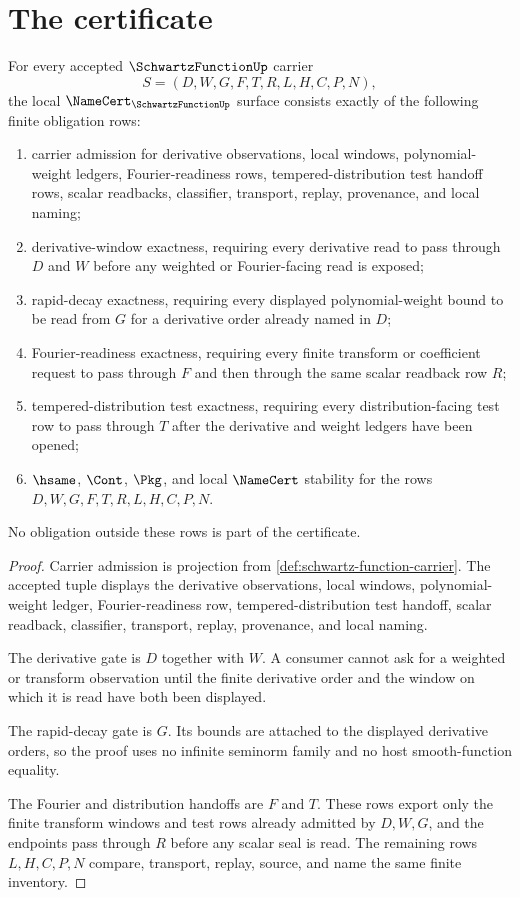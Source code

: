 \section{The certificate}
\label{sec:schwartz-function-certificate}

\begin{theorem}
\label{thm:schwartz-function-namecert-obligations}
For every accepted $\SchwartzFunctionUp$ carrier
$$
S=(D,W,G,F,T,R,L,H,C,P,N),
$$
the local $\NameCert_{\SchwartzFunctionUp}$ surface consists exactly of the following finite obligation rows:
\begin{enumerate}
\item carrier admission for derivative observations, local windows, polynomial-weight ledgers, Fourier-readiness rows, tempered-distribution test handoff rows, scalar readbacks, classifier, transport, replay, provenance, and local naming;
\item derivative-window exactness, requiring every derivative read to pass through $D$ and $W$ before any weighted or Fourier-facing read is exposed;
\item rapid-decay exactness, requiring every displayed polynomial-weight bound to be read from $G$ for a derivative order already named in $D$;
\item Fourier-readiness exactness, requiring every finite transform or coefficient request to pass through $F$ and then through the same scalar readback row $R$;
\item tempered-distribution test exactness, requiring every distribution-facing test row to pass through $T$ after the derivative and weight ledgers have been opened;
\item $\hsame$, $\Cont$, $\Pkg$, and local $\NameCert$ stability for the rows $D,W,G,F,T,R,L,H,C,P,N$.
\end{enumerate}
No obligation outside these rows is part of the certificate.
\end{theorem}
\begin{proof}
Carrier admission is projection from \autoref{def:schwartz-function-carrier}. The accepted tuple displays the derivative observations, local windows, polynomial-weight ledger, Fourier-readiness row, tempered-distribution test handoff, scalar readback, classifier, transport, replay, provenance, and local naming.

The derivative gate is $D$ together with $W$. A consumer cannot ask for a weighted or transform observation until the finite derivative order and the window on which it is read have both been displayed.

The rapid-decay gate is $G$. Its bounds are attached to the displayed derivative orders, so the proof uses no infinite seminorm family and no host smooth-function equality.

The Fourier and distribution handoffs are $F$ and $T$. These rows export only the finite transform windows and test rows already admitted by $D,W,G$, and the endpoints pass through $R$ before any scalar seal is read. The remaining rows $L,H,C,P,N$ compare, transport, replay, source, and name the same finite inventory.
\end{proof}
